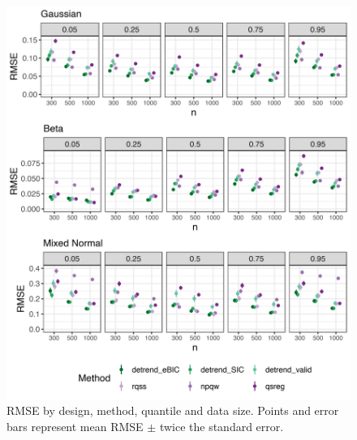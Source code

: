\documentclass[aoas]{imsart}
\begin{document}
\begin{figure}
	\includegraphics[width=\linewidth]{Figures/sim_metrics.png}
	\caption{RMSE by design, method, quantile and data size. Points and error bars represent mean RMSE $\pm$ twice the standard error.}
	\label{fig:quantile_mse}
\end{figure}

\end{document}
